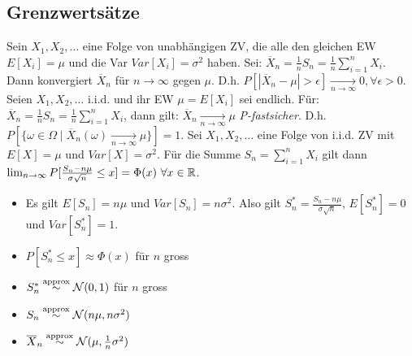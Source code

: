 \subsection{Grenzwertsätze}
\begin{itemize}
     Sein $X_1, X_2, \dots$ eine Folge von unabhängigen ZV, die alle den gleichen EW $E[X_i] = \mu$ und die Var $Var[X_i] = \sigma^2$ haben. Sei: $\overline{X}_n = \frac{1}{n} S_n = \frac{1}{n} \sum_{i=1}^{n} X_i$. Dann konvergiert $\overline{X}_n$ für $n \to \infty$ gegen $\mu$. D.h. $P[|\overline{X}_n - \mu| > \epsilon] \underset{n \to \infty}{\to} 0, \forall \epsilon > 0$.
     Seien $X_1, X_2, \dots$ i.i.d. und ihr EW $\mu = E[X_i]$ sei endlich. Für: $\overline{X}_n = \frac{1}{n} S_n = \frac{1}{n} \sum_{i=1}^{n} X_i$, dann gilt: $\overline{X}_n \underset{n \to \infty}{\to} \mu$ \textit{P-fastsicher}. D.h. $P[\{\omega \in \Omega \mid \overline{X}_n(\omega) \underset{n \to \infty}{\to} \mu\}] = 1$.
     Sei $X_1, X_2, \dots$ eine Folge von i.i.d. ZV mit $E[X] = \mu$ und $Var[X] = \sigma^2$. Für die Summe $S_n = \sum_{i=1}^{n} X_i$ gilt dann $\lim_{n \to \infty} P[\frac{S_n - n \mu}{\sigma \sqrt{n}} \le x] = \Phi(x) \ \forall x \in \mathbb{R}$.
        \begin{itemize}
            \item Es gilt $E[S_n] = n\mu$ und $Var[S_n] = n\sigma^2$. Also gilt $S_n^* = \frac{S_n - n\mu}{\sigma \sqrt{n}}$, $E[S_n^*] = 0$ und $Var[S_n^*] = 1$.
            \item $P[S_n^* \le x] \approx \Phi(x)$ für $n$ gross
            \item $S_n^* \overset{\text{approx}}{\sim} \mathcal{N}(0,1)$ für $n$ gross
            \item $S_n \overset{\text{approx}}{\sim} \mathcal{N}(n \mu, n \sigma^2)$
            \item $\overline{X}_n \overset{\text{approx}}{\sim} \mathcal{N}(\mu, \frac{1}{n} \sigma^2)$
        \end{itemize}
\end{itemize}

